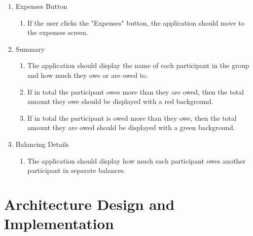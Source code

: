 \documentclass[conference]{IEEEtran}
\begin{document}
\begin{enumerate}
\begin{enumerate}
\begin{enumerate}
                    \end{enumerate}
                \item Expenses Button
                    \begin{enumerate}
                        \item If the user clicks the "Expenses" button, the application should move to the expenses screen.
                    \end{enumerate}
                \item Summary
                    \begin{enumerate}
                        \item The application should display the name of each participant in the group and how much they owe or are owed to.
                        \item If in total the participant owes more than they are owed, then the total amount they owe should be displayed with a red background.
                        \item If in total the participant is owed more than they owe, then the total amount they are owed should be displayed with a green background.
                    \end{enumerate}
                \item Balancing Details
                    \begin{enumerate}
                        \item The application should display how much each participant owes another participant in separate balances.
                    \end{enumerate}
            \end{enumerate}
    \end{enumerate}

\section{Architecture Design and Implementation}
\end{document}
